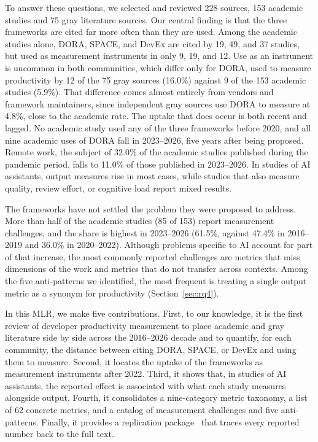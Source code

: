 \documentclass[preprint,number]{elsarticle}
\newcounter{study}
\begin{document}
To answer these questions, we selected and reviewed 228 sources, 153 academic studies and 75 gray literature sources. Our central finding is that the three frameworks are cited far more often than they are used. Among the academic studies alone, DORA, SPACE, and DevEx are cited by 19, 49, and 37 studies, but used as measurement instruments in only 9, 19, and 12. Use as an instrument is uncommon in both communities, which differ only for DORA, used to measure productivity by 12 of the 75 gray sources (16.0\%) against 9 of the 153 academic studies (5.9\%). That difference comes almost entirely from vendors and framework maintainers, since independent gray sources use DORA to measure at 4.8\%, close to the academic rate. The uptake that does occur is both recent and lagged. No academic study used any of the three frameworks before 2020, and all nine academic uses of DORA fall in 2023--2026, five years after being proposed.
Remote work, the subject of 32.0\% of the academic studies published during the pandemic period, falls to 11.0\% of those published in 2023--2026.
In studies of AI assistants, output measures rise in most cases, while studies that also measure quality, review effort, or cognitive load report mixed results.

The frameworks have not settled the problem they were proposed to address. More than half of the academic studies (85 of 153) report measurement challenges, and the share is highest in 2023--2026 (61.5\%, against 47.4\% in 2016--2019 and 36.0\% in 2020--2022). Although problems specific to AI account for part of that increase, the most commonly reported challenges are metrics that miss dimensions of the work and metrics that do not transfer across contexts. Among the five anti-patterns we identified, the most frequent is treating a single output metric as a synonym for productivity (Section~\ref{sec:rq4}).

In this MLR, we make five contributions. First, to our knowledge, it is the first review of developer productivity measurement to place academic and gray literature side by side across the 2016--2026 decade and to quantify, for each community, the distance between citing DORA, SPACE, or DevEx and using them to measure. Second, it locates the uptake of the frameworks as measurement instruments after 2022. Third, it shows that, in studies of AI assistants, the reported effect is associated with what each study measures alongside output. Fourth, it consolidates a nine-category metric taxonomy, a list of 62 concrete metrics, and a catalog of measurement challenges and five anti-patterns. Finally, it provides a replication package~\cite{replication2026} that traces every reported number back to the full text.
\end{document}
